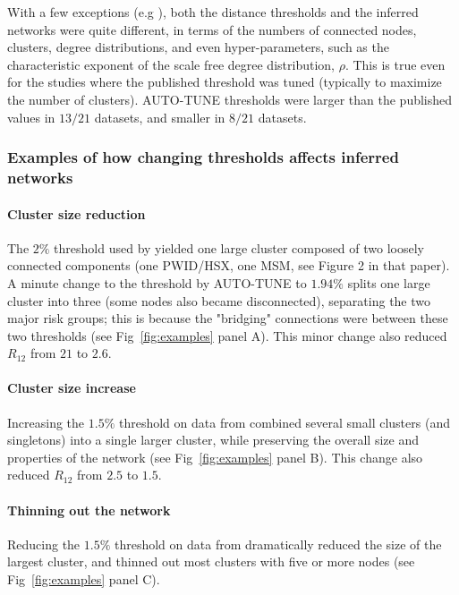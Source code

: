 \documentclass[utf8]{FrontiersinHarvard} %
\begin{document}
With a few exceptions (e.g \cite{dalai_combining_2018,sivay_hiv-1_2018}), both
the distance thresholds and the inferred networks were quite different, in
terms of the numbers of connected nodes, clusters, degree distributions, and
even hyper-parameters, such as the characteristic exponent of the scale free
degree distribution, $\rho$. This is true even for the studies where the
published threshold was tuned (typically to maximize the number of clusters).
AUTO-TUNE thresholds were larger than the published values in $13/21$ datasets,
and smaller in $8/21$ datasets.

\subsubsection{Examples of how changing thresholds affects inferred networks}

\paragraph{Cluster size reduction} The $2\%$ threshold used by \citet{dalai_combining_2018} yielded one large
cluster composed of two loosely connected components (one PWID/HSX, one MSM,
see Figure 2 in that paper). A minute change to the threshold by AUTO-TUNE to
$1.94\%$ splits one large cluster into three (some nodes also became
disconnected), separating the two major risk groups; this is because the
"bridging" connections were between these two thresholds (see
Fig~\ref{fig:examples} panel A). This minor change also reduced $R_{12}$
from $21$ to $2.6$.

\paragraph{Cluster size increase}  Increasing the $1.5\%$ threshold on data from \citet{Little:2014aa} combined
several small clusters (and singletons) into a single larger cluster, while
preserving the overall size and properties of the network (see
Fig~\ref{fig:examples} panel B). This change also reduced $R_{12}$ from
$2.5$ to $1.5$.

\paragraph{Thinning out the network}  Reducing the $1.5\%$ threshold on data from \citet{rhee_national_2019}
dramatically reduced the size of the largest cluster, and thinned out most
clusters with five or more nodes (see Fig~\ref{fig:examples} panel C).
\end{document}
